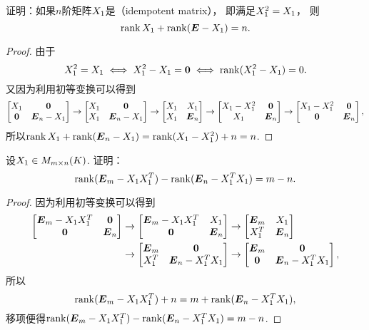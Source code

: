 \begin{example}
证明：如果\(n\)阶矩阵\(X_1\)是（idempotent matrix），
即满足\(X_1^2=X_1\)，
则\[
	\rank X_1+\rank(\boldsymbol{E}-X_1)=n.
\]
\begin{proof}
由于\[
	X_1^2=X_1
	\iff
	X_1^2-X_1=\boldsymbol{0}
	\iff
	\rank(X_1^2-X_1)=0.
\]
又因为利用初等变换可以得到\[
	\begin{bmatrix}
		X_1 & \boldsymbol{0} \\
		\boldsymbol{0} & \boldsymbol{E}_n-X_1
	\end{bmatrix}
	\to \begin{bmatrix}
		X_1 & \boldsymbol{0} \\
		X_1 & \boldsymbol{E}_n-X_1
	\end{bmatrix}
	\to \begin{bmatrix}
		X_1 & X_1 \\
		X_1 & \boldsymbol{E}_n
	\end{bmatrix}
	\to \begin{bmatrix}
		X_1-X_1^2 & \boldsymbol{0} \\
		X_1 & \boldsymbol{E}_n
	\end{bmatrix}
	\to \begin{bmatrix}
		X_1-X_1^2 & \boldsymbol{0} \\
		\boldsymbol{0} & \boldsymbol{E}_n
	\end{bmatrix},
\]
所以\(\rank X_1+\rank(\boldsymbol{E}_n-X_1)
=\rank(X_1-X_1^2)+n
=n\).
\end{proof}
\end{example}

\begin{example}
设\(X_1 \in M_{m \times n}(K)\).
证明：\[
	\rank(\boldsymbol{E}_m-X_1X_1^T)-\rank(\boldsymbol{E}_n-X_1^TX_1)=m-n.
\]
\begin{proof}
因为利用初等变换可以得到\begin{align*}
	\begin{bmatrix}
		\boldsymbol{E}_m-X_1X_1^T & \boldsymbol{0} \\
		\boldsymbol{0} & \boldsymbol{E}_n
	\end{bmatrix}
	&\to \begin{bmatrix}
		\boldsymbol{E}_m-X_1X_1^T & X_1 \\
		\boldsymbol{0} & \boldsymbol{E}_n
	\end{bmatrix}
	\to \begin{bmatrix}
		\boldsymbol{E}_m & X_1 \\
		X_1^T & \boldsymbol{E}_n
	\end{bmatrix} \\
	&\to \begin{bmatrix}
		\boldsymbol{E}_m & \boldsymbol{0} \\
		X_1^T & \boldsymbol{E}_n-X_1^TX_1
	\end{bmatrix}
	\to \begin{bmatrix}
		\boldsymbol{E}_m & \boldsymbol{0} \\
		\boldsymbol{0} & \boldsymbol{E}_n-X_1^TX_1
	\end{bmatrix},
\end{align*}
所以\[
	\rank(\boldsymbol{E}_m-X_1X_1^T)+n=m+\rank(\boldsymbol{E}_n-X_1^TX_1),
\]
移项便得\(\rank(\boldsymbol{E}_m-X_1X_1^T)-\rank(\boldsymbol{E}_n-X_1^TX_1)=m-n\).
\end{proof}
\end{example}

